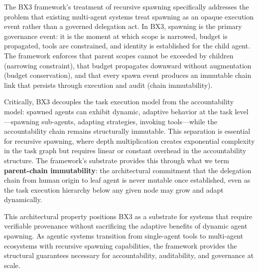 The BX3 framework's treatment of recursive spawning specifically addresses the problem that existing multi-agent systems treat spawning as an opaque execution event rather than a governed delegation act. In BX3, spawning is the primary governance event: it is the moment at which scope is narrowed, budget is propagated, tools are constrained, and identity is established for the child agent. The framework enforces that parent scopes cannot be exceeded by children (narrowing constraint), that budget propagates downward without augmentation (budget conservation), and that every spawn event produces an immutable chain link that persists through execution and audit (chain immutability).

Critically, BX3 decouples the task execution model from the accountability model: spawned agents can exhibit dynamic, adaptive behavior at the task level---spawning sub-agents, adapting strategies, invoking tools---while the accountability chain remains structurally immutable. This separation is essential for recursive spawning, where depth multiplication creates exponential complexity in the task graph but requires linear or constant overhead in the accountability structure. The framework's substrate provides this through what we term \textbf{parent-chain immutability}: the architectural commitment that the delegation chain from human origin to leaf agent is never mutable once established, even as the task execution hierarchy below any given node may grow and adapt dynamically.

This architectural property positions BX3 as a substrate for systems that require verifiable provenance without sacrificing the adaptive benefits of dynamic agent spawning. As agentic systems transition from single-agent tools to multi-agent ecosystems with recursive spawning capabilities, the framework provides the structural guarantees necessary for accountability, auditability, and governance at scale.\label{sec:recursive-spawning}